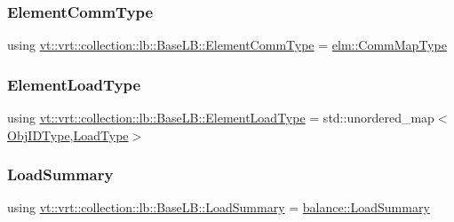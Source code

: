 \subsubsection{\texorpdfstring{Element\+Comm\+Type}{ElementCommType}}
{\footnotesize\ttfamily using \hyperlink{structvt_1_1vrt_1_1collection_1_1lb_1_1_base_l_b_a83eb4daec14edfb8780422e95b8e38d3}{vt\+::vrt\+::collection\+::lb\+::\+Base\+L\+B\+::\+Element\+Comm\+Type} =  \hyperlink{namespacevt_1_1elm_a38487cb8896b9b4763efa9022fab560e}{elm\+::\+Comm\+Map\+Type}}

\mbox{\label{structvt_1_1vrt_1_1collection_1_1lb_1_1_base_l_b_adfae019ae1d55a6bf4f080f9b455fca4}} 
\subsubsection{\texorpdfstring{Element\+Load\+Type}{ElementLoadType}}
{\footnotesize\ttfamily using \hyperlink{structvt_1_1vrt_1_1collection_1_1lb_1_1_base_l_b_adfae019ae1d55a6bf4f080f9b455fca4}{vt\+::vrt\+::collection\+::lb\+::\+Base\+L\+B\+::\+Element\+Load\+Type} =  std\+::unordered\+\_\+map$<$\hyperlink{structvt_1_1vrt_1_1collection_1_1lb_1_1_base_l_b_a790b22acf448880599724749cdc4e9b3}{Obj\+I\+D\+Type},\hyperlink{namespacevt_a8fb51741340b87d7aaee0bef60e9896b}{Load\+Type}$>$}

\mbox{\label{structvt_1_1vrt_1_1collection_1_1lb_1_1_base_l_b_aa78583f362acc50fcca87d4ce3150151}} 
\subsubsection{\texorpdfstring{Load\+Summary}{LoadSummary}}
{\footnotesize\ttfamily using \hyperlink{structvt_1_1vrt_1_1collection_1_1lb_1_1_base_l_b_aa78583f362acc50fcca87d4ce3150151}{vt\+::vrt\+::collection\+::lb\+::\+Base\+L\+B\+::\+Load\+Summary} =  \hyperlink{structvt_1_1vrt_1_1collection_1_1balance_1_1_load_summary}{balance\+::\+Load\+Summary}}

